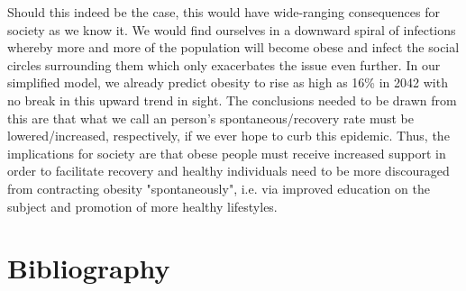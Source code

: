 \documentclass[11pt]{article}
\begin{document}
Should this indeed be the case, this would have wide-ranging consequences for society as we know it. We would find ourselves in a downward spiral of infections whereby more and more of the population will become obese and infect the social circles surrounding them which only exacerbates the issue even further. In our simplified model, we already predict obesity to rise as high as 16\% in 2042 with no break in this upward trend in sight. The conclusions needed to be drawn from this are that what we call an person's spontaneous/recovery rate must be lowered/increased, respectively, if we ever hope to curb this epidemic. Thus, the implications for society are that obese people must receive increased support in order to facilitate recovery and healthy individuals need to be more discouraged from contracting obesity "spontaneously", i.e. via improved education on the subject and promotion of more healthy lifestyles. 

\newpage

\section{Bibliography}



\end{document}
